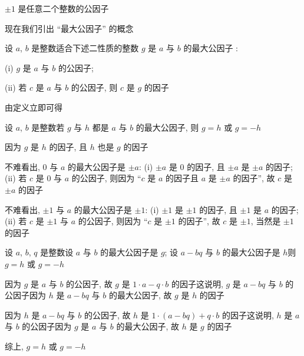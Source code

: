 \begin{example}
    $\pm 1$ 是任意二个整数的公因子\period
\end{example}

现在我们引出 ``最大公因子'' 的概念\period

\begin{definition}
    设 $a$, $b$ 是整数\period 适合下述二性质的整数 $g$ 是 $a$ 与 $b$ 的最大公因子 :

    (i) $g$ 是 $a$ 与 $b$ 的公因子;

    (ii) 若 $c$ 是 $a$ 与 $b$ 的公因子, 则 $c$ 是 $g$ 的因子\period
\end{definition}

由定义立即可得
\begin{proposition}
    设 $a$, $b$ 是整数\period 若 $g$ 与 $h$ 都是 $a$ 与 $b$ 的最大公因子, 则 $g = h$ 或 $g = -h$\period
\end{proposition}

\begin{pf}
    因为 $g$ 是 $h$ 的因子, 且 $h$ 也是 $g$ 的因子\period
\end{pf}

\begin{example}
    不难看出, $0$ 与 $a$ 的最大公因子是 $\pm a$: (i) $\pm a$ 是 $0$ 的因子, 且 $\pm a$ 是 $\pm a$ 的因子; (ii) 若 $c$ 是 $0$ 与 $a$ 的公因子, 则因为 ``$c$ 是 $a$ 的因子且 $a$ 是 $\pm a$ 的因子'', 故 $c$ 是 $\pm a$ 的因子\period
\end{example}

\begin{example}
    不难看出, $\pm 1$ 与 $a$ 的最大公因子是 $\pm 1$: (i) $\pm 1$ 是 $\pm 1$ 的因子, 且 $\pm 1$ 是 $a$ 的因子; (ii) 若 $c$ 是 $\pm 1$ 与 $a$ 的公因子, 则因为 ``$c$ 是 $\pm 1$ 的因子'', 故 $c$ 是 $\pm 1$, 当然是 $\pm 1$ 的因子\period
\end{example}

\begin{proposition}
    设 $a$, $b$, $q$ 是整数\period 设 $a$ 与 $b$ 的最大公因子是 $g$; 设 $a - bq$ 与 $b$ 的最大公因子是 $h$\period 则 $g = h$ 或 $g = -h$\period
\end{proposition}

\begin{pf}
    因为 $g$ 是 $a$ 与 $b$ 的公因子, 故 $g$ 是 $1 \cdot a - q \cdot b$ 的因子\period 这说明, $g$ 是 $a - bq$ 与 $b$ 的公因子\period 因为 $h$ 是 $a - bq$ 与 $b$ 的最大公因子, 故 $g$ 是 $h$ 的因子\period

    因为 $h$ 是 $a - bq$ 与 $b$ 的公因子, 故 $h$ 是 $1 \cdot (a - bq) + q \cdot b$ 的因子\period 这说明, $h$ 是 $a$ 与 $b$ 的公因子\period 因为 $g$ 是 $a$ 与 $b$ 的最大公因子, 故 $h$ 是 $g$ 的因子\period

    综上, $g = h$ 或 $g = -h$\period
\end{pf}

